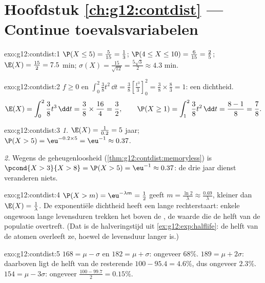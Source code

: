 \section*{Hoofdstuk \ref{ch:g12:contdist} --- Continue toevalsvariabelen}

\begin{solution}{exo:g12:contdist:1}
$\P(X \leq 5) = \frac{5}{15} = \frac13$;
$\P(4 \leq X \leq 10) = \frac{6}{15} = \frac25$;
$\E(X) = \frac{15}{2} = 7.5$ min;
$\sigma(X) = \frac{15}{\sqrt{12}} = \frac{5\sqrt3}{2} \approx 4.3$ min.
\end{solution}

\begin{solution}{exo:g12:contdist:2}
$f \geq 0$ en
$\int_0^2 \frac38 t^2\,\dd t = \frac38\left[\frac{t^3}{3}\right]_0^2
= \frac38 \times \frac83 = 1$: een dichtheid.
\[
\E(X) = \int_0^2 \frac38 t^3\,\dd t = \frac38 \times \frac{16}{4} = \frac32,
\qquad
\P(X \geq 1) = \int_1^2 \frac38 t^2\,\dd t = \frac{8 - 1}{8} = \frac78 .
\]
\end{solution}

\begin{solution}{exo:g12:contdist:3}
\emph{1.} $\E(X) = \frac{1}{0.2} = 5$ jaar;
$\P(X > 5) = \eu^{-0.2\times5} = \eu^{-1} \approx 0.37$.

\emph{2.} Wegens de geheugenloosheid (\cref{thm:g12:contdist:memoryless}) is
$\pcond{X > 3}{X > 8} = \P(X > 5) = \eu^{-1} \approx 0.37$: de drie jaar
dienst veranderen niets.
\end{solution}

\begin{solution}{exo:g12:contdist:4}
$\P(X > m) = \eu^{-\lambda m} = \frac12$ geeft
$m = \frac{\ln 2}{\lambda} \approx \frac{0.69}{\lambda}$, kleiner dan
$\E(X) = \frac1\lambda$. De exponentiële dichtheid heeft een lange rechterstaart:
enkele ongewoon lange levensduren trekken het \emph{} boven de
\emph{}, de waarde die de helft van de populatie overtreft. (Dat is de
halveringstijd uit \cref{ex:g12:exp:halflife}: de helft van de atomen overleeft
ze, hoewel de  levensduur langer is.)
\end{solution}

\begin{solution}{exo:g12:contdist:5}
$168 = \mu - \sigma$ en $182 = \mu + \sigma$: ongeveer $68\%$.
$189 = \mu + 2\sigma$: daarboven ligt de helft van de resterende
$100 - 95.4 = 4.6\%$, dus ongeveer $2.3\%$.
$154 = \mu - 3\sigma$: ongeveer $\frac{100 - 99.7}{2} = 0.15\%$.
\end{solution}

